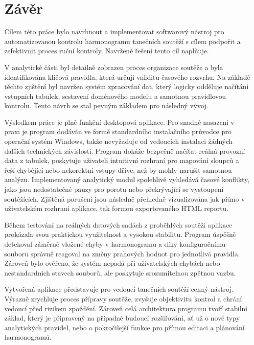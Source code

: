 \documentclass[czech, kiv, ba, he, iso690alph, pdf]{fasthesis}
\begin{document}
	\chapter{Závěr}
	
		Cílem této práce bylo navrhnout a implementovat softwarový nástroj pro automatizovanou kontrolu harmonogramu tanečních soutěží s cílem podpořit a zefektivnit proces ruční kontroly. Navržené řešení tento cíl naplňuje.
	
		V analytické části byl detailně zobrazen proces organizace soutěže a byla identifikována klíčová pravidla, která určují validitu časového rozvrhu. Na základě těchto zjištění byl navržen systém zpracování dat, který logicky odděluje načítání vstupních tabulek, sestavení doménového modelu a samotnou pravidlovou kontrolu. Tento návrh se stal pevným základem pro následný vývoj.
	
		Výsledkem práce je plně funkční desktopová aplikace. Pro snadné nasazení v praxi je program dodáván ve formě standardního instalačního průvodce pro operační systém Windows, takže nevyžaduje od vedoucích instalaci žádných dalších technických závislostí. Program dokáže bezpečně načítat reálná provozní data z tabulek, poskytuje uživateli intuitivní rozhraní pro mapování sloupců a řeší chybějící nebo nekorektní vstupy dříve, než by mohly narušit samotnou analýzu. Implementovaný analytický modul spolehlivě vyhledává časové konflikty, jako jsou nedostatečné pauzy pro porotu nebo překrývající se vystoupení soutěžících. Zjištěná porušení jsou následně přehledně vizualizována jak přímo v uživatelském rozhraní aplikace, tak formou exportovaného HTML reportu.

		Během testování na reálných datových sadách z proběhlých soutěží aplikace prokázala svou praktickou využitelnost a vysokou stabilitu. Program úspěšně detekoval záměrně vložené chyby v harmonogramu a díky konfiguračnímu souboru správně reagoval na změny prahových hodnot pro jednotlivá pravidla. Zároveň bylo ověřeno, že systém nepadá při uživatelských chybách nebo nestandardních stavech souborů, ale poskytuje srozumitelnou zpětnou vazbu.
	
		Vytvořená aplikace představuje pro vedoucí tanečních soutěží cenný nástroj. Výrazně zrychluje proces přípravy soutěže, zvyšuje objektivitu kontrol a chrání vedoucí před rizikem zpoždění. Zároveň celá architektura programu tvoří stabilní základ, který je připravený na případné budoucí rozšiřování, ať už o nové typy analytických pravidel, nebo o pokročilejší funkce pro přímou editaci a plánování harmonogramů.
	
\end{document}
